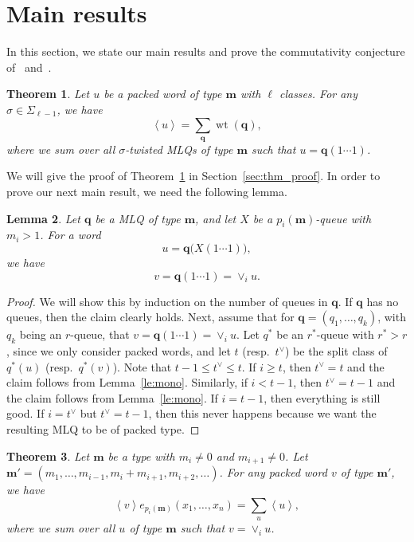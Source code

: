 \documentclass[reqno]{amsart}
\newcommand{\0}{\phantom{c}}
\newcommand{\swt}[1]{\left\langle #1 \right\rangle} %
\newcommand{\merge}[1]{\vee_{#1}} %
\newcommand{\SymGp}[1]{\Sigma_{#1}} %
\DeclareMathOperator{\wt}{wt} %
\newcommand{\mm}{\mathbf{m}}
\newcommand{\qq}{\mathbf{q}}
\let\sumnonlimits\sum
\renewcommand{\sum}{\sumnonlimits\limits}
\theoremstyle{plain}
\newtheorem{thm}{Theorem}[section]
\newtheorem{lemma}[thm]{Lemma}
\theoremstyle{definition}
\numberwithin{equation}{section}
\newcommand{\travis}[1]{\todo[size=\tiny,color=blue!30]{#1 \\ \hfill --- Travis}}
\begin{document}
\section{Main results}
\label{sec:result}


In this section, we state our main results and prove the commutativity conjecture of~\cite{AAMP} and~\cite[Conj.~3.10]{AasLin17}.

\begin{thm}
\label{thm:permutation}
  Let $u$ be a packed word of type $\mm$ with $\ell$ classes.
  For any $\sigma \in \SymGp{\ell-1}$, we have 
  \[
  \swt{u} = \sum_{\qq} \wt(\qq),
  \]
  where we sum over all $\sigma$-twisted MLQs of type $\mm$ such that $u = \qq(1\dotsm 1)$.
\end{thm}

We will give the proof of Theorem~\ref{thm:permutation} in Section~\ref{sec:thm_proof}.
In order to prove our next main result, we need the following lemma.

\begin{lemma}
\label{lemma:queue_merge}
  Let $\qq$ be a MLQ of type $\mm$, and let $X$ be a $p_i(\mm)$-queue with $m_i > 1$.
  For a word
  \[
  u = \qq\bigl( X(1 \dotsm 1) \bigr),
  \]
  we have
  \[
  v = \qq(1 \dotsm 1) = \merge{i} u.
  \]
\end{lemma}

\begin{proof}
  We will show this by induction on the number of queues in $\qq$.
  If $\qq$ has no queues, then the claim clearly holds.
  Next, assume that for $\qq = (q_1, \dotsc, q_k)$, with $q_k$ being an $r$-queue, that $v = \qq(1 \dotsm 1) = \merge{i} u$.
  Let $q^*$ be an $r^*$-queue with $r^* > r$, since we only consider packed words, and let $t$ (resp.~$t^{\vee}$) be the split class of $q^*(u)$ (resp.~$q^*(v)$).
  Note that $t - 1 \leq t^{\vee} \leq t$.
  If $i \geq t$, then $t^{\vee} = t$ and the claim follows from Lemma~\ref{le:mono}.
  Similarly, if $i < t - 1$, then $t^{\vee} = t - 1$ and the claim follows from Lemma~\ref{le:mono}.
  If $i = t - 1$, then everything is still good.
  If $i = t^{\vee}$ but $t^{\vee} = t - 1$, then this never happens because we want the resulting MLQ to be of packed type.
  \travis{To be finished.}
\end{proof}

\begin{thm}
\label{thm:merge}
  Let $\mm$ be a type with $m_i \neq 0$ and $m_{i+1} \neq 0$.
  Let $\mm' = (m_1, \dotsc, m_{i-1}, m_i + m_{i+1}, m_{i+2}, \ldots)$.
  For any packed word $v$ of type $\mm'$, we have
\[
  \swt{v} e_{p_i(\mm)}(x_1, \dotsc, x_n) = \sum_u \swt{u},
\]
where we sum over all $u$ of type $\mm$ such that $v = \merge{i} u$.
\end{thm}
\end{document}
